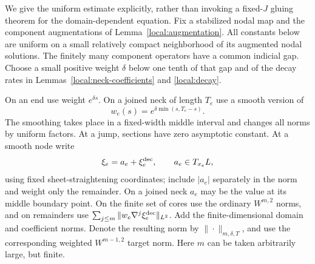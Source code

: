 We give the uniform estimate explicitly, rather than invoking a fixed-$J$
gluing theorem for the domain-dependent equation.  Fix a stabilized nodal
map and the component augmentations of Lemma~\ref{local:augmentation}.
All constants below are uniform on a small relatively compact neighborhood
of its augmented nodal solutions.  The finitely many component operators
have a common indicial gap.  Choose a small positive weight $\delta$ below
one tenth of that gap and of the decay rates in
Lemmas~\ref{local:neck-coefficients} and \ref{local:decay}.

On an end use weight $e^{\delta s}$.  On a joined neck of length $T_e$
use a smooth version of
\begin{equation}\label{local:weight-function}
 w_e(s)=e^{\delta\min(s,T_e-s)}.
\end{equation}
The smoothing takes place in a fixed-width middle interval and changes
all norms by uniform factors.  At a jump, sections have zero asymptotic
constant.  At a smooth node write
\[
 \xi_e=a_e+\xi_e^{\rm dec},\qquad a_e\in T_{x_e}L,
\]
using fixed sheet-straightening coordinates; include $|a_e|$ separately
in the norm and weight only the remainder.  On a joined neck $a_e$ may
be the value at its middle boundary point.  On the finite set of cores
use the ordinary $W^{m,2}$ norms, and on remainders use
$\sum_{j\leq m}\|w_e\nabla^j\xi_e^{\rm dec}\|_{L^2}$.
Add the finite-dimensional domain and coefficient norms.  Denote the
resulting norm by $\|\cdot\|_{m,\delta,T}$, and use the corresponding
weighted $W^{m-1,2}$ target norm.  Here $m$ can be taken arbitrarily
large, but finite.

